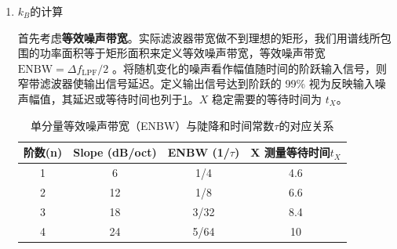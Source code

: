 \documentclass[dvipsnames, svgnames,a4paper,11pt]{article}
\begin{document}
\begin{enumerate}
		由于实验的目标是测量未经滤波器影响的噪声信号，因此我们需要将传递函数中的频率衰减效应修正回来。通过乘以传递函数的倒数，可以得到修正后的噪声功率：
		\[
		n_{\text{Tx}}^2 = n_{\text{Rx}}^2 \cdot \left[ 1 + (\omega R_{\text{in}} C_{\text{in}})^2 \right]
		\]
		这样我们就补偿了输入电路对噪声信号的衰减效应，得到接近理想条件下的噪声功率。
		
		此外，锁相放大器自身产生的本底噪声也需要从测量结果中扣除，假设本底噪声的功率为 \( n_{\text{Bx}}^2 \)，最终修正后的噪声功率为：
		\[
		n_{\text{Tx}}^2 = n_{\text{Rx}}^2 \left[ 1 + (\omega R_{\text{in}} C_{\text{in}})^2 \right] - n_{\text{Bx}}^2
		\]
		
		为什么本底噪声不必做输入带宽修正？本底噪声是锁相放大器内部的固有噪声，不经过外部输入电路，因此不会受到输入带宽的影响，也无需进行带宽修正。而外部噪声，如电阻的热噪声，会受到输入阻抗和滤波器的影响，因此需要进行带宽修正。
		
		此外，注意讲义上提到的非随机的环境噪声$n_{ex}$。
		
		实验讲义上提供了具体的数值：影响输入带宽的 $R_{\text{in}}$ 约为 $2/3R$，$C_{\text{in}}$ 约为电缆电容（室温下约为 96pF/m）、锁相放大器输入电容（25pF），与包括连接器和样品盒在内的电容并联后的值的 1/2（约 \textbf{68pF}）。
		
		\item $k_B$的计算
		
		首先考虑\textbf{等效噪声带宽}。实际滤波器带宽做不到理想的矩形，我们用谱线所包围的功率面积等于矩形面积来定义等效噪声带宽，等效噪声带宽 $\text{ENBW} = \Delta f_{\text{LPF}}/2$ 。将随机变化的噪声看作幅值随时间的阶跃输入信号，则窄带滤波器使输出信号延迟。定义输出信号达到阶跃的 99\% 视为反映输入噪声幅值，其延迟或等待时间也列于\cref{tab:ENBW}。$X$ 稳定需要的等待时间为 $t_X$。
		
		\begin{table}[h!]
			\centering
			\caption{单分量等效噪声带宽（ENBW）与陡降和时间常数$\tau$的对应关系}
			\label{tab:ENBW}
			\begin{tabular}{cccc}
				\hline
				\textbf{阶数(n)} & \textbf{Slope (dB/oct)} & \textbf{ENBW (1/$\tau$)} & \textbf{X 测量等待时间$t_X$}\\
				\hline
				1 & 6 & 1/4 & 4.6 \\
				2 & 12 & 1/8 & 6.6 \\
				3 & 18 & 3/32 & 8.4 \\
				4 & 24 & 5/64 & 10 \\
				\hline
			\end{tabular}
		\end{table}
		

\end{enumerate}
\end{document}

